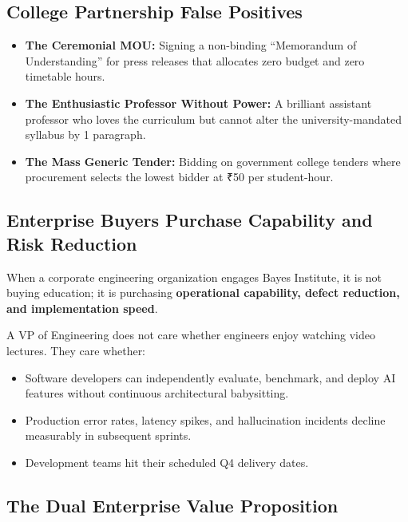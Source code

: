 \subsection{College Partnership False Positives}

\begin{itemize}[leftmargin=1.2em,itemsep=0.2ex]
  \item \textbf{The Ceremonial MOU:} Signing a non-binding ``Memorandum of Understanding'' for press releases that allocates zero budget and zero timetable hours.
  \item \textbf{The Enthusiastic Professor Without Power:} A brilliant assistant professor who loves the curriculum but cannot alter the university-mandated syllabus by 1 paragraph.
  \item \textbf{The Mass Generic Tender:} Bidding on government college tenders where procurement selects the lowest bidder at ₹50 per student-hour.
\end{itemize}

\subsection{Enterprise Buyers Purchase Capability and Risk Reduction}

When a corporate engineering organization engages Bayes Institute, it is not buying education; it is purchasing \textbf{operational capability, defect reduction, and implementation speed}.

A VP of Engineering does not care whether engineers enjoy watching video lectures. They care whether:
\begin{itemize}[leftmargin=1.2em,itemsep=0.2ex]
  \item Software developers can independently evaluate, benchmark, and deploy AI features without continuous architectural babysitting.
  \item Production error rates, latency spikes, and hallucination incidents decline measurably in subsequent sprints.
  \item Development teams hit their scheduled Q4 delivery dates.
\end{itemize}

\subsection{The Dual Enterprise Value Proposition}

